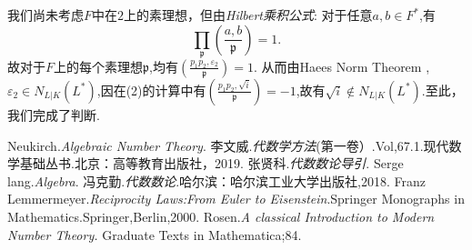 \documentclass[UTF8]{article}
\begin{document}
 我们尚未考虑$F$中在$2$上的素理想，但由\emph{Hilbert乘积公式}:
 对于任意$a,b\in F^*$,有
 $$
 \prod_{\mathfrak{p}}\left(\frac{a,b}{\mathfrak{p}}\right)=1.
 $$
 故对于$F$上的每个素理想$\mathfrak{p}$,均有$\left(\frac{p_{1}p_{2},\varepsilon_{2}}{\mathfrak{p}}\right)=1.$
 从而由Haees Norm Theorem ,$\varepsilon_{2}\in N_{L|K}(L^*)$,因在(2)的计算中有$\left(\frac{p_{1}p_{2},\sqrt{i}}{\mathfrak{p}}\right)=-1$,故有$\sqrt{i}\notin N_{L|K}(L^*)$.至此，我们完成了判断.
 
 
 \begin{thebibliography}{99}
		 Neukirch.\emph{Algebraic Number Theory}.
		 李文威.\emph{代数学方法}(第一卷）.Vol,67.1.现代数学基础丛书.北京：高等教育出版社，2019.
		张贤科.\emph{代数数论导引}.
		Serge lang.\emph{Algebra}.
		冯克勤.\emph{代数数论}.哈尔滨：哈尔滨工业大学出版社,2018.
		 Franz Lemmermeyer.\emph{Reciprocity Laws:From Euler to Eisenstein}.Springer Monographs in Mathematics.Springer,Berlin,2000.
  Rosen.\emph{A classical Introduction to Modern Number Theory.} Graduate Texts in Mathematica;84. 
	\end{thebibliography}
\end{document}
